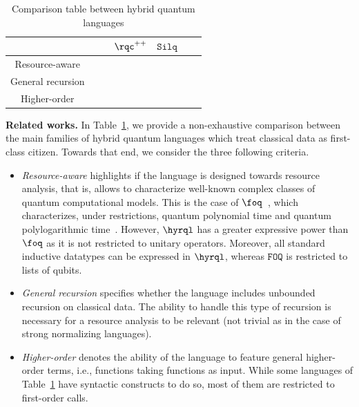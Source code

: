 \begingroup
\newcommand{\cmark}{\ding{51}}
\newcommand{\xmark}{\ding{55}}
\renewcommand{\arraystretch}{1.2}
\setlength\tabcolsep{3pt}
\begin{table}[!h]
  \begin{center}
      \begin{tabular}{c | c | c | c | c | c | c }
        & \hyrql{} &\foq{} \cite{HPS23} & $\rqc^{++}$ \cite{YZ24} &
        $\mathtt{Silq}$ \cite{Silq20} & \qunity{} \cite{Qunity23} & \dlpz{}
        \cite{DLPZ25} \\ \hline 
        Resource-aware & \cmark & \cmark & \xmark & \xmark & \xmark & \xmark \\
        \hline
        General recursion & \cmark & \xmark & \cmark & \xmark & \xmark & \xmark
        \\
        Higher-order & \cmark & \xmark & \xmark & \xmark & \xmark & \xmark
      \end{tabular}
  \end{center}
  \caption{Comparison table between hybrid quantum languages }
  \label{tab:related}
  \vspace*{-0.5cm}
\end{table}
\endgroup

\medskip
\noindent
\textbf{Related works. }
In Table~\ref{tab:related}, we provide a non-exhaustive comparison between the
main families of hybrid quantum languages which treat classical data as
first-class citizen.
Towards that end, we consider the three following criteria.
\begin{itemize} 
  \item \textit{Resource-aware} highlights if the language is designed towards
    resource analysis, that is, allows to characterize well-known complex
    classes of quantum computational models. This is the case of
    $\foq$~\cite{HPS23,HPS25}, which characterizes, under restrictions, quantum
    polynomial time and quantum polylogarithmic time~\cite{FHPS25}.
    However, $\hyrql$ has a greater expressive power than $\foq$  as it is not
    restricted to unitary operators. Moreover, all standard inductive datatypes
    can be expressed in $\hyrql$, whereas $\texttt{FOQ}$ is restricted to lists
    of qubits. 

  \item \textit{General recursion} specifies whether the language includes
    unbounded recursion on classical data. The ability to handle this type of recursion is
    necessary for a resource analysis to be relevant (\ie not trivial as in
    the case of strong normalizing languages). 

  \item \textit{Higher-order} denotes the ability of the language to
    feature general higher-order terms, i.e., functions taking functions as
    input. While some languages of Table~\ref{tab:related} have syntactic
    constructs to do so, most of them are restricted to first-order calls. 
\end{itemize}

